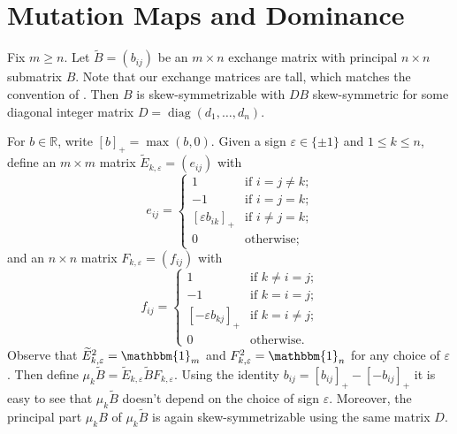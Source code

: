 \documentclass{amsart}
\numberwithin{theorem}{section}
\newcommand{\bfb}{\boldsymbol{b}}
\newcommand{\RR}{\mathbb{R}}
\newcommand{\bOne}{\mathbbm{1}}
\newcommand{\diag}{\operatorname{diag}}
\begin{document}
  \section{Mutation Maps and Dominance}
  Fix $m\ge n$.
  Let $\widetilde B=(b_{ij})$ be an $m\times n$ exchange matrix with principal $n\times n$ submatrix $B$.
  Note that our exchange matrices are tall, which matches the convention of \cite{qin}.
  Then $B$ is skew-symmetrizable with $DB$ skew-symmetric for some diagonal integer matrix $D=\diag(d_1,\ldots,d_n)$.
 
  For $b\in\RR$, write $[b]_+=\max(b,0)$.
  Given a sign $\varepsilon\in\{\pm1\}$ and $1\le k\le n$, define an $m\times m$ matrix $\widetilde E_{k,\varepsilon}=(e_{ij})$ with
  \begin{equation}
    \label{eq:left mutation matrix}
    e_{ij}=\begin{cases} 1 & \text{if $i=j\ne k$;}\\ -1 & \text{if $i=j=k$;}\\ [\varepsilon b_{ik}]_+ & \text{if $i\ne j=k$;}\\ 0 & \text{otherwise;} \end{cases}
  \end{equation}
  and an $n\times n$ matrix $F_{k,\varepsilon}=(f_{ij})$ with
  \begin{equation}
    \label{eq:right mutation matrix}
    f_{ij}=\begin{cases} 1 & \text{if $k\ne i=j$;}\\ -1 & \text{if $k=i=j$;}\\ [-\varepsilon b_{kj}]_+ & \text{if $k=i\ne j$;}\\ 0 & \text{otherwise.} \end{cases}
  \end{equation}
  Observe that $\widetilde E^2_{k,\varepsilon}=\bOne_m$ and $F^2_{k,\varepsilon}=\bOne_n$ for any choice of $\varepsilon$.
  Then define $\mu_k\widetilde B=\widetilde E_{k,\varepsilon} \widetilde B F_{k,\varepsilon}$.
  Using the identity $b_{ij}=[b_{ij}]_+-[-b_{ij}]_+$ it is easy to see that $\mu_k\widetilde B$ doesn't depend on the choice of sign $\varepsilon$.
  Moreover, the principal part $\mu_k B$ of $\mu_k\widetilde B$ is again skew-symmetrizable using the same matrix $D$.
\end{document}
